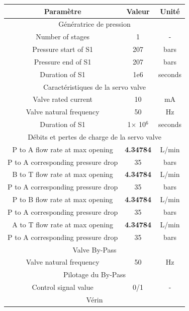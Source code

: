 \documentclass[a4paper,12pt,calibri,oneside,openany]{book}
\theoremstyle{break}
\begin{document}
\begin{table}[H]
	\centering
	\begin{tabular}{|c|c|c|}
		\hline
		\cellcolor{gray!30}Paramètre & \cellcolor{gray!30}Valeur & \cellcolor{gray!30}Unité\\
		\hline
		\multicolumn{3}{c}{\cellcolor{green!30}Génératrice de pression} \\
		\hline
		Number of stages & 1 & -\\
		\hline
		Pressure start of S1 & 207 & bars\\
		\hline 
		Pressure end of S1 & 207 & bars\\
		\hline
		Duration of S1 & 1e6 & seconds\\
		\hline
		\multicolumn{3}{c}{\cellcolor{green!30}Caractéristiques de la servo valve} \\
		\hline
		Valve rated current & 10 & mA\\
		\hline 
		Valve natural frequency & 50 & Hz\\
		\hline
		Duration of S1 & 1$\times$ 10$^6$ & seconds\\
		\hline
		\multicolumn{3}{c}{\cellcolor{green!30}Débits et pertes de charge de la servo valve} \\
		\hline
		P to A flow rate at max opening & \textbf{4.34784} & L/min\\
		\hline
		P to A corresponding pressure drop & 35 & bars\\
		\hline
		B to T flow rate at max opening & \textbf{4.34784} & L/min\\
		\hline
		P to A corresponding pressure drop & 35 & bars\\
		\hline
		P to B flow rate at max opening & \textbf{4.34784} & L/min\\
		\hline
		P to A corresponding pressure drop & 35 & bars\\
		\hline
		A to T flow rate at max opening & \textbf{4.34784} & L/min\\
		\hline
		P to A corresponding pressure drop & 35 & bars\\
		\hline
		\multicolumn{3}{c}{\cellcolor{green!30}Valve By-Pass} \\
		\hline
		Valve natural frequency & 50 & Hz\\
		\hline
		\multicolumn{3}{c}{\cellcolor{green!30}Pilotage du By-Pass} \\
		\hline
		Control signal value & 0/1 & -\\
		\hline
		\multicolumn{3}{c}{\cellcolor{green!30}Vérin} \\

\end{tabular}
\end{table}
\end{document}
